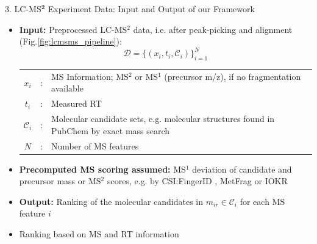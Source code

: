\documentclass{beamer}
\newcommand{\ms}{MS}
\newcommand{\lc}{LC}
\newcommand{\msone}{\ms$^1$}
\newcommand{\msms}{\ms$^2$}
\newcommand{\lcms}{\lc-\ms}
\newcommand{\lcmsms}{\lc-\msms}
\newcommand{\spec}{x}
\newcommand{\rt}{t}
\newcommand{\cands}{\mathcal{C}}
\newcommand{\seqlength}{N}
\begin{document}
\begin{frame}{}
\begin{columns}[T]
    \begin{block}{{\normalsize 3. \lcms$^\mathbf{2}$ Experiment Data: Input and Output of our Framework}}
    \begin{itemize}
        \item \textbf{Input:} Preprocessed \lcmsms{} data, i.e. after peak-picking and alignment (Fig.\ref{fig:lcmsms_pipeline}):
        \vspace{0.15cm}
            \begin{equation}
                \mathcal{D}=\{(\spec_i,\rt_i,\cands_i)\}_{i=1}^\seqlength
            \end{equation}
        \begin{tabularx}{\textwidth}{ccX}
            $\spec_i$ & : & \ms{} Information; \msms{} or \msone{} (precursor m/z), if no fragmentation available \\
            $\rt_i$ & : & Measured RT \\
            $\cands_i$ & : & {Molecular candidate sets, e.g. molecular structures found in PubChem by \newline exact mass search} \\
            $\seqlength$ & : & Number of \ms{} features   \\
        \end{tabularx}
        \item \textbf{Precomputed \ms{} scoring assumed:} \msone{} deviation of candidate and precursor mass or \msms{} scores, e.g. by CSI:FingerID \cite{Duehrkop2019}, MetFrag \cite{Ruttkies2016} or IOKR \cite{Brouard_ismb_2016}
        \item \textbf{Output:} Ranking of the molecular candidates in $m_{ir}\in\mathcal{C}_i$ for each \ms{} feature $i$
        \item Ranking based on \ms{} and RT information
    \end{itemize}
    \vspace{-0.35cm}
    \end{block}



\end{columns}
\end{frame}
\end{document}
